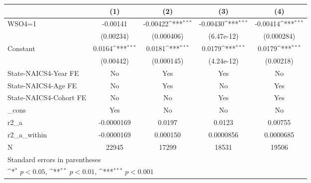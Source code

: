 {
\def\sym#1{\ifmmode^{#1}\else\(^{#1}\)\fi}
\begin{tabular}{l*{4}{c}}
\hline\hline
                    &\multicolumn{1}{c}{(1)}         &\multicolumn{1}{c}{(2)}         &\multicolumn{1}{c}{(3)}         &\multicolumn{1}{c}{(4)}         \\
\hline
WSO4=1              &    -0.00141         &    -0.00422\sym{***}&    -0.00430\sym{***}&    -0.00414\sym{***}\\
                    &   (0.00234)         &  (0.000406)         &  (6.47e-12)         &  (0.000284)         \\
[1em]
Constant            &      0.0164\sym{***}&      0.0181\sym{***}&      0.0179\sym{***}&      0.0179\sym{***}\\
                    &   (0.00442)         &  (0.000145)         &  (4.24e-12)         &   (0.00218)         \\
[1em]
State-NAICS4-Year FE&          No         &         Yes         &         Yes         &          No         \\
[1em]
State-NAICS4-Age FE &          No         &         Yes         &          No         &         Yes         \\
[1em]
State-NAICS4-Cohort FE&          No         &          No         &         Yes         &         Yes         \\
[1em]
\_cons              &         Yes         &          No         &          No         &          No         \\
\hline
r2\_a                &  -0.0000169         &      0.0197         &      0.0123         &     0.00755         \\
r2\_a\_within         &  -0.0000169         &    0.000150         &   0.0000856         &   0.0000685         \\
N                   &       22945         &       17299         &       18531         &       19506         \\
\hline\hline
\multicolumn{5}{l}{\footnotesize Standard errors in parentheses}\\
\multicolumn{5}{l}{\footnotesize \sym{*} \(p<0.05\), \sym{**} \(p<0.01\), \sym{***} \(p<0.001\)}\\
\end{tabular}
}
